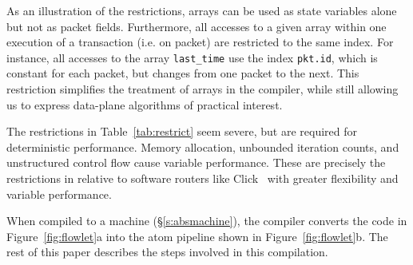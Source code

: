 As an illustration of the restrictions, arrays can be used as state variables
alone but not as packet fields.  Furthermore, all accesses to a given array
within one execution of a transaction (i.e. on packet) are restricted to the
same index. For instance, all accesses to the array \texttt{last\_time} use the
index \texttt{pkt.id}, which is constant for each packet, but changes from one
packet to the next. This restriction simplifies the treatment of arrays in the
compiler, while still allowing us to express data-plane algorithms of practical interest.

The restrictions in Table~\ref{tab:restrict} seem severe, but are required
for deterministic performance.  Memory allocation, unbounded iteration counts,
and unstructured control flow cause variable performance. These are precisely
the restrictions in \pktlanguage relative to software routers like
Click~\cite{click} with greater flexibility and variable performance.

When compiled to a \absmachine machine (\S\ref{s:absmachine}), the \pktlanguage
compiler converts the code in Figure~\ref{fig:flowlet}a into the atom pipeline
shown in Figure~\ref{fig:flowlet}b. The rest of this paper describes the steps
involved in this compilation.

%
